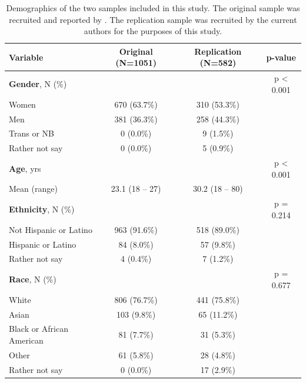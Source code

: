 \documentclass[letterpaper,man,natbib,floatsintext,longtable]{apa6}
\begin{document}
\begin{table}[t!]
    \centering
    \begin{tabular*}{\textwidth}{lccc}
    \toprule
    Variable & Original (N=1051) & Replication (N=582) & p-value \\
    \midrule
    \textbf{Gender}, N (\%)                & & & p < 0.001 \\
    \hspace{1em} Women                     & 670 (63.7\%) & 310 (53.3\%) & \\
    \hspace{1em} Men                       & 381 (36.3\%) & 258 (44.3\%) & \\
    \hspace{1em} Trans or NB               &   0  (0.0\%) &   9  (1.5\%) & \\
    \hspace{1em} Rather not say            &   0  (0.0\%) &   5  (0.9\%) & \\
    \midrule
    \textbf{Age}, yrs                      & & & p < 0.001 \\
    \hspace{1em} Mean (range)              & 23.1 (18 -- 27) & 30.2 (18 -- 80) & \\
    \midrule
    \textbf{Ethnicity}, N (\%)             & & & p = 0.214 \\
    \hspace{1em} Not Hispanic or Latino    & 963 (91.6\%) & 518 (89.0\%) & \\
    \hspace{1em} Hispanic or Latino        &  84  (8.0\%) &  57  (9.8\%) & \\
    \hspace{1em} Rather not say            &   4  (0.4\%) &   7  (1.2\%) & \\
    \midrule
    \textbf{Race}, N (\%)                  & & & p = 0.677 \\
    \hspace{1em} White                     & 806 (76.7\%) & 441 (75.8\%) & \\ 
    \hspace{1em} Asian                     & 103  (9.8\%) &  65 (11.2\%) & \\
    \hspace{1em} Black or African American &  81  (7.7\%) &  31  (5.3\%) & \\
    \hspace{1em} Other                     &  61  (5.8\%) &  28  (4.8\%) & \\
    \hspace{1em} Rather not say            &   0  (0.0\%) &  17  (2.9\%) & \\
    \bottomrule
    \end{tabular*}
    \caption{\normalfont Demographics of the two samples included in this study. The original sample was recruited and reported by \cite{teicher2015maltreatment}. The replication sample was recruited by the current authors for the purposes of this study.}
    \label{tab:demographics}
\end{table}
\end{document}
